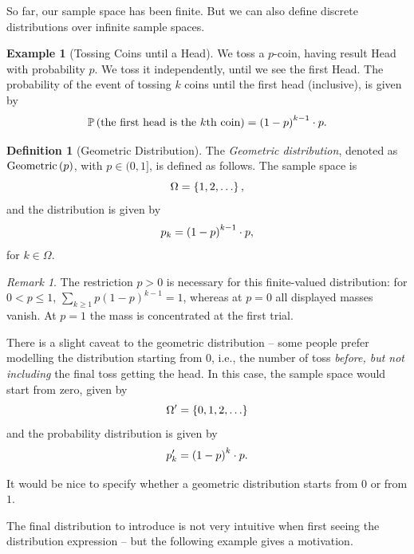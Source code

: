 \documentclass{article}
\theoremstyle{definition}
\newtheorem{definition}[theorem]{Definition}
\newtheorem{example}[theorem]{Example}
\theoremstyle{remark}
\newtheorem{remark}[theorem]{Remark}
\newcommand{\Prob}{\mathbb{P}}
\newcommand{\ocintv}[2]{(#1,#2]}
\newcommand{\Geometric}{\operatorname{Geometric}}
\begin{document}
So far, our sample space has been finite. But we can also define discrete distributions over infinite sample spaces.

\begin{example}[Tossing Coins until a Head]
    \label{ex:tossing-coins-until-head}%
    We toss a \(p\)-coin, having result Head with probability \(p\). We toss it independently, until we see the first Head. The probability of the event of tossing \(k\) coins until the first head (inclusive), is given by
    \[
        \Prob\pqty{\text{the first head is the }k\text{th coin}} = \pqty{1 - p}^{k - 1} \cdot p.
    \]
\end{example}

\begin{definition}[Geometric Distribution]
    \label{def:geometric-distribution}%
    The \emph{Geometric distribution}, denoted as \(\Geometric\pqty{p}\), with \(p \in \ocintv{0}{1}\), is defined as follows. The sample space is
    \[
        \Omega = \left\{1, 2, \ldots\right\},
    \]
    and the distribution is given by
    \[
        p_k = \left(1 - p\right)^{k - 1} \cdot p,
    \]
    for \(k \in \Omega\).
\end{definition}
\begin{remark}
The restriction $p>0$ is necessary for this finite-valued distribution: for $0<p\leq1$, $\sum_{k\geq1}p(1-p)^{k-1}=1$, whereas at $p=0$ all displayed masses vanish. At $p=1$ the mass is concentrated at the first trial.
\end{remark}


There is a slight caveat to the geometric distribution -- some people prefer modelling the distribution starting from \(0\), i.e., the number of toss \emph{before, but not including} the final toss getting the head. In this case, the sample space would start from zero, given by
\[
    \Omega' = \left\{0, 1, 2, \ldots\right\}
\]
and the probability distribution is given by
\[
    p'_k = \left(1 - p\right)^{k} \cdot p.
\]

It would be nice to specify whether a geometric distribution starts from \(0\) or from \(1\).

The final distribution to introduce is not very intuitive when first seeing the distribution expression -- but the following example gives a motivation.
\end{document}
